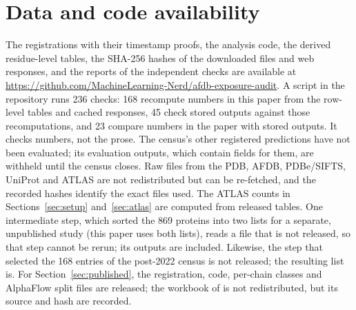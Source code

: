 \documentclass{article}
\begin{document}
\section*{Data and code availability}

The registrations with their timestamp proofs, the analysis code, the
derived residue-level tables, the SHA-256 hashes of the downloaded files and
web responses, and the reports of the independent checks are available at
\url{https://github.com/MachineLearning-Nerd/afdb-exposure-audit}. A script in the repository runs 236 checks: 168 recompute numbers in this paper from the row-level tables and cached responses, 45 check stored outputs against those recomputations, and 23 compare numbers in the paper with stored outputs. It checks numbers, not the prose. The census's other registered predictions have not been evaluated; its evaluation outputs, which contain fields for them, are withheld until the census closes. Raw files from the PDB, AFDB, PDBe/SIFTS,
UniProt and ATLAS are not redistributed but can be re-fetched, and the
recorded hashes identify the exact files used. The ATLAS counts in
Sections~\ref{sec:setup} and~\ref{sec:atlas} are computed from released
tables. One intermediate step, which sorted the 869 proteins into two lists for a separate, unpublished study (this paper uses both lists), reads a file that is not released, so that step cannot be rerun; its outputs are included. Likewise, the step that selected the 168 entries of the post-2022 census is not released; the resulting list is. For Section~\ref{sec:published}, the registration, code, per-chain classes and AlphaFlow split files are released; the workbook of \citet{terwilliger2024} is not redistributed, but its source and hash are recorded.


{\raggedright\small
\setlength{\bibsep}{1pt plus 0.3ex}

}
\end{document}
